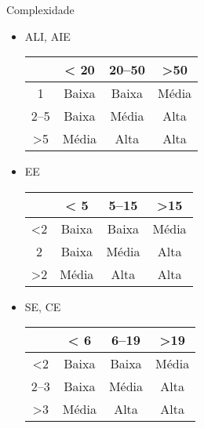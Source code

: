 \begin{frame}{Complexidade}\footnotesize

  \begin{itemize}[<+->]
  \item ALI, AIE\\
    \begin{center}
    \begin{tabular}[ht]{|c|c|c|c|}\hline
      & \bf <  20 & \bf 20--50 &\bf  >50 \\\hline
      1 & Baixa & Baixa & Média \\
      2--5 & Baixa &  Média & Alta \\
      >5 & Média & Alta & Alta \\\hline
    \end{tabular}
  \end{center}
  
  \item EE\\
    \begin{center}
    \begin{tabular}[ht]{|c|c|c|c|}\hline
      & \bf <  5 & \bf 5--15 &\bf  >15 \\\hline
      <2 & Baixa & Baixa & Média \\
      2 & Baixa &  Média & Alta \\
      >2 & Média & Alta & Alta \\\hline
    \end{tabular}
  \end{center}

\item SE, CE\\
    \begin{center}
    \begin{tabular}[ht]{|c|c|c|c|}\hline
      & \bf <  6 & \bf 6--19 &\bf  >19 \\\hline
      <2 & Baixa & Baixa & Média \\
      2--3 & Baixa &  Média & Alta \\
      >3 & Média & Alta & Alta \\\hline
    \end{tabular}
  \end{center}
\end{itemize}
\end{frame}

